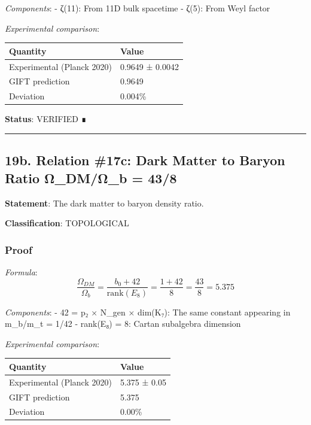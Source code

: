 \documentclass[11pt,a4paper]{article}
\begin{document}
\emph{Components}:
- ζ(11): From 11D bulk spacetime
- ζ(5): From Weyl factor

\emph{Experimental comparison}:

{\def\LTcaptype{none} %
\begin{longtable}[]{@{}ll@{}}
\toprule\noalign{}
Quantity & Value \\
\midrule\noalign{}
\endhead
\bottomrule\noalign{}
\endlastfoot
Experimental (Planck 2020) & 0.9649 ± 0.0042 \\
GIFT prediction & 0.9649 \\
Deviation & 0.004\% \\
\end{longtable}
}

\textbf{Status}: VERIFIED ∎

\begin{center}\rule{0.5\linewidth}{0.5pt}\end{center}

\subsection{19b. Relation \#17c: Dark Matter to Baryon Ratio Ω\_DM/Ω\_b = 43/8}\label{b.-relation-17c-dark-matter-to-baryon-ratio-ux3c9_dmux3c9_b-438}

\textbf{Statement}: The dark matter to baryon density ratio.

\textbf{Classification}: TOPOLOGICAL

\subsubsection{Proof}\label{proof-22}

\emph{Formula}:
\[\frac{\Omega_{DM}}{\Omega_b} = \frac{b_0 + 42}{\text{rank}(E_8)} = \frac{1 + 42}{8} = \frac{43}{8} = 5.375\]

\emph{Components}:
- 42 = p₂ × N\_gen × dim(K₇): The same constant appearing in m\_b/m\_t = 1/42
- rank(E₈) = 8: Cartan subalgebra dimension

\emph{Experimental comparison}:

{\def\LTcaptype{none} %
\begin{longtable}[]{@{}ll@{}}
\toprule\noalign{}
Quantity & Value \\
\midrule\noalign{}
\endhead
\bottomrule\noalign{}
\endlastfoot
Experimental (Planck 2020) & 5.375 ± 0.05 \\
GIFT prediction & 5.375 \\
Deviation & 0.00\% \\
\end{longtable}
}
\end{document}

